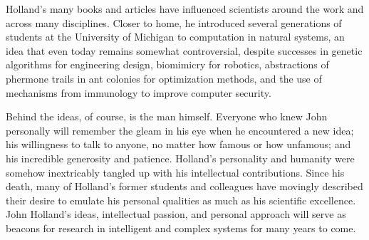 \documentclass{sig-alternate}
\begin{document}
Holland's many books and articles have influenced scientists around
the work and across many disciplines.  Closer to home, he introduced
several generations of students at the University of Michigan to
computation in natural systems, an idea that even today remains
somewhat controversial, despite successes in genetic algorithms for
engineering design, biomimicry for robotics, abstractions of phermone
trails in ant colonies for optimization methods, and the use of
mechanisms from immunology to improve computer security.

Behind the ideas, of course, is the man himself.   Everyone who knew
John personally will remember the gleam in his eye when he
encountered a new idea; his willingness to talk to anyone, no matter
how famous or how unfamous; and his incredible generosity and patience.
Holland's personality and humanity were somehow inextricably tangled
up with his intellectual contributions.  Since his death, many of
Holland's former students and colleagues have movingly described their
desire to emulate his personal qualities as much as his scientific
excellence.  John Holland's ideas, intellectual passion, and personal approach will serve as
beacons for research in intelligent and complex systems for many
years to come. 






\end{document}
